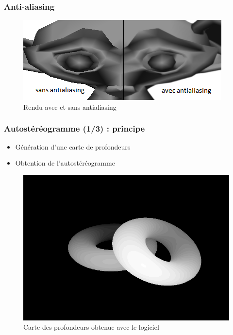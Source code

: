 \documentclass{beamer}
\begin{document}
\begin{frame}
\frametitle{Anti-aliasing}
\begin{figure}
\centering
\includegraphics[scale=0.8]{antialiasing.png}
\caption{Rendu avec et sans antialiasing}
\end{figure}

\end{frame}


%
\begin{frame}
\frametitle{Autostéréogramme (1/3) : principe}

\begin{itemize}[label=$\bullet$]
\item Génération d'une carte de profondeurs
\item Obtention de l'autostéréogramme
\end{itemize}

\begin{figure}
\centering
\includegraphics[scale=0.22]{donutdepth.png}
\caption{Carte des profondeurs obtenue avec le logiciel}
\end{figure}
\end{frame}
\end{document}
